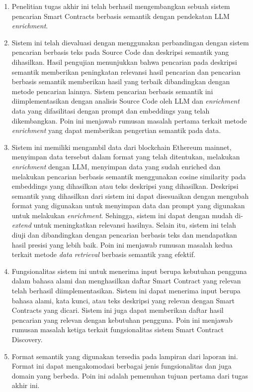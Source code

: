 \begin{enumerate}
    \item Penelitian tugas akhir ini telah berhasil mengembangkan sebuah sistem pencarian Smart Contracts berbasis semantik dengan pendekatan LLM \textit{enrichment}.
    \item Sistem ini telah dievaluasi dengan menggunakan perbandingan dengan sistem pencarian berbasis teks pada Source Code dan deskripsi semantik yang dihasilkan. Hasil pengujian menunjukkan bahwa pencarian pada deskripsi semantik memberikan peningkatan relevansi hasil pencarian dan pencarian berbasis semantik memberikan hasil yang terbaik dibandingkan dengan metode pencarian lainnya. Sistem pencarian berbasis semantik ini diimplementasikan dengan analisis Source Code oleh LLM dan \textit{enrichment} data yang difasilitasi dengan prompt dan embeddings yang telah dikembangkan. Poin ini menjawab rumusan masalah pertama terkait metode \textit{enrichment} yang dapat memberikan pengertian semantik pada data.
    \item Sistem ini memiliki mengambil data dari blockchain Ethereum mainnet, menyimpan data tersebut dalam format yang telah ditentukan, melakukan \textit{enrichment} dengan LLM, menyimpan data yang sudah enriched dan melakukan pencarian berbasis semantik menggunakan cosine similarity pada embeddings yang dihasilkan atau teks deskripsi yang dihasilkan. Deskripsi semantik yang dihasilkan dari sistem ini dapat disesuaikan dengan mengubah format yang digunakan untuk menyimpan data dan prompt yang digunakan untuk melakukan \textit{enrichment}. Sehingga, sistem ini dapat dengan mudah di-\textit{extend} untuk meningkatkan relevansi hasilnya. Selain itu, sistem ini telah diuji dan dibandingkan dengan pencarian berbasis teks dan mendapatkan hasil presisi yang lebih baik. Poin ini menjawab rumusan masalah kedua terkait metode \textit{data retrieval} berbasis semantik yang efektif. 
    \item Fungsionalitas sistem ini untuk menerima input berupa kebutuhan pengguna dalam bahasa alami dan menghasilkan daftar Smart Contract yang relevan telah berhasil diimplementasikan. Sistem ini dapat menerima input berupa bahasa alami, kata kunci, atau teks deskripsi yang relevan dengan Smart Contracts yang dicari. Sistem ini juga dapat memberikan daftar hasil pencarian yang relevan dengan kebutuhan pengguna. Poin ini menjawab rumusan masalah ketiga terkait fungsionalitas sistem Smart Contract Discovery.
    \item Format semantik yang digunakan tersedia pada lampiran dari laporan ini. Format ini dapat mengakomodasi berbagai jenis fungsionalitas dan juga domain yang berbeda. Poin ini adalah pemenuhan tujuan pertama dari tugas akhir ini.

\end{enumerate}
